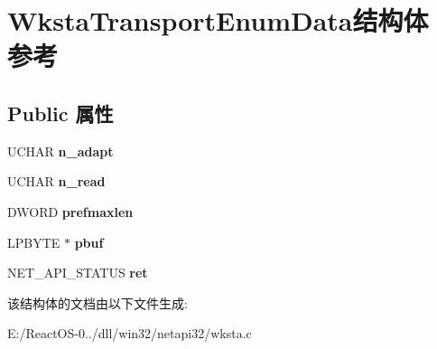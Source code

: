 \hypertarget{struct_wksta_transport_enum_data}{}\section{Wksta\+Transport\+Enum\+Data结构体 参考}
\label{struct_wksta_transport_enum_data}
\subsection*{Public 属性}
\begin{DoxyCompactItemize}
\item 
\mbox{\label{struct_wksta_transport_enum_data_a17661a9566e4250586aa794df37e6946}} 
U\+C\+H\+AR {\bfseries n\+\_\+adapt}
\item 
\mbox{\label{struct_wksta_transport_enum_data_a84421d6909f5627c5a8f1984e54ef542}} 
U\+C\+H\+AR {\bfseries n\+\_\+read}
\item 
\mbox{\label{struct_wksta_transport_enum_data_ae9166c68ddf0762a855f59f58053b6f0}} 
D\+W\+O\+RD {\bfseries prefmaxlen}
\item 
\mbox{\label{struct_wksta_transport_enum_data_a1f2861eb6d6d14e91d9cd1424c53cd27}} 
L\+P\+B\+Y\+TE $\ast$ {\bfseries pbuf}
\item 
\mbox{\label{struct_wksta_transport_enum_data_acab21cb3918b7a3ba45684d9bbce5dbb}} 
N\+E\+T\+\_\+\+A\+P\+I\+\_\+\+S\+T\+A\+T\+US {\bfseries ret}
\end{DoxyCompactItemize}


该结构体的文档由以下文件生成\+:\begin{DoxyCompactItemize}
\item 
E\+:/\+React\+O\+S-\/0../dll/win32/netapi32/wksta.\+c\end{DoxyCompactItemize}
